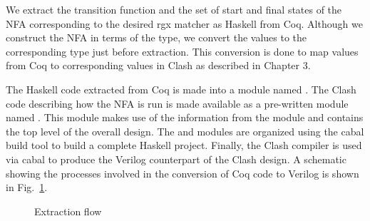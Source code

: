 

We extract the transition function and the set of start and final
states of the \gls{NFA} corresponding to the desired \gls{rgx} matcher
as Haskell from Coq.
Although we construct the \gls{NFA} in terms of the  type,
we convert the  values to the corresponding 
type just before extraction.
This conversion is done to map  values from Coq to
corresponding  values in Clash as described in Chapter 3.

The Haskell code extracted from Coq is made into a module named
.
The Clash code describing how the \gls{NFA} is run is made available
as a pre-written module named . 
This module makes use of the information from the 
module and contains the top level of the overall design.
The  and  modules are organized using the
cabal build tool to build a complete Haskell project.
Finally, the Clash compiler is used via cabal to produce the Verilog
counterpart of the Clash design.
A schematic showing the processes involved in the conversion of Coq
code to Verilog is shown in Fig.~\ref{fig:extr2hdl-flow}.

\begin{figure}
  \begin{center}
  
  \end{center}
  \caption{Extraction flow}
  \label{fig:extr2hdl-flow}
\end{figure}

